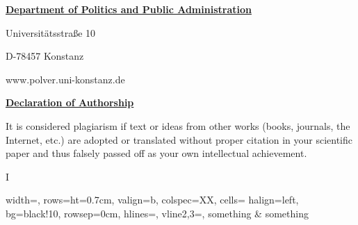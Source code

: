 \documentclass[a4paper,11pt,xcolor=dvipsnames]{article}
\begin{document}
{\small

\thispagestyle{page1}


\setlength{\parindent}{0cm}
\myhelvetica

{
    \raggedleft
    \small

    \textbf{\normalsize\ul{Department of Politics and Public Administration}}

    \scriptsize
    \vspace{0.4cm}

    Universitätsstraße 10

    D-78457 Konstanz

    \vspace{0.2cm}

    www.polver.uni-konstanz.de

}

\vspace{0.25cm}
\begingroup
{\large{\textbf{\ul{Declaration of Authorship}}}}

\raggedright
\vspace{0.5cm}

It is considered plagiarism if text or ideas from other works (books, journals, the Internet, etc.) are adopted or translated without proper citation in your scientific paper and thus falsely passed off as your own intellectual achievement.

\vspace{0.5cm}

\begin{minipage}[c]{0.05\textwidth}
    I
\end{minipage}\begin{minipage}{0.95\textwidth}
        \begin{tblr}{
            width=\linewidth,
            rows={ht=0.7cm, valign=b},
            colspec={XX},
            cells= {halign=left, bg=black!10},
            rowsep=0cm,
            hlines={},
            vline{2,3}={},
        }
        something & something\\
        \end{tblr}
\end{minipage}

}
\end{document}
